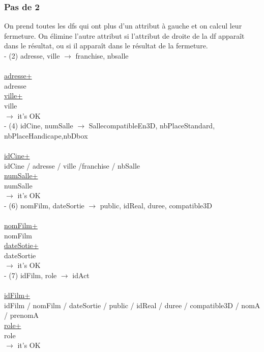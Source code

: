 \documentclass[a4paper,sffamily,12pt]{article}
\begin{document}
				\vspace{0.5cm}
									
			\subsubsection{Pas de 2}

				\vspace{0.5cm}
	
				On prend toutes les dfs qui ont plus d'un attribut à gauche et on calcul leur fermeture. On élimine l'autre attribut si l'attribut de droite de la df apparaît dans le résultat, ou si il apparaît dans le résultat de la fermeture. \\
				
				\noindent - (2) adresse, ville $\rightarrow$ franchise, nbsalle \\
					\\
					\underline{adresse+} \\
					adresse \\
					\underline{ville+} \\
					ville \\
				$\rightarrow$ it's OK \\

				\noindent - (4) idCine, numSalle $\rightarrow$ SallecompatibleEn3D, nbPlaceStandard, nbPlaceHandicape,nbDbox \\
					\\
					\underline{idCine+} \\
					idCine / adresse / ville /franchise / nbSalle \\
					\underline{numSalle+} \\
					numSalle \\
				$\rightarrow$ it's OK \\
				
				\noindent - (6) nomFilm, dateSortie $\rightarrow$ public, idReal, duree, compatible3D \\																						\\
					\underline{nomFilm+} \\
					nomFilm \\
					\underline{dateSotie+} \\
					dateSortie \\
				$\rightarrow$ it's OK \\
			
				\noindent - (7) idFilm, role $\rightarrow$  idAct \\
					\\
					\underline{idFilm+} \\
					idFilm / nomFilm / dateSortie / public / idReal / duree / compatible3D / nomA / prenomA \\
					\underline{role+} \\
					role \\
				$\rightarrow$ it's OK \\
					
\end{document}
